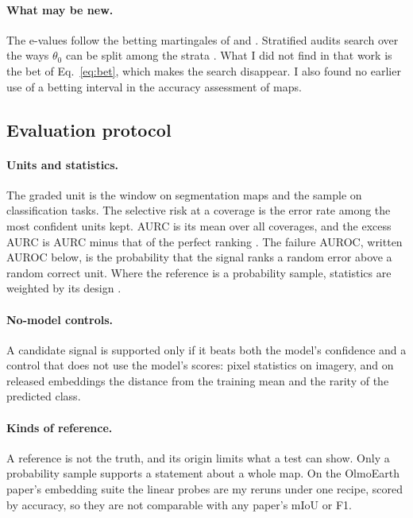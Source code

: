 \documentclass[11pt,a4paper]{article}
\begin{document}
\paragraph{What may be new.} The e-values follow the betting martingales of \citet{waudbysmith2020,waudbysmith2024}
and \citet{stark2023alpha}. Stratified audits search over the ways $\theta_0$ can be split among the strata
\citep{ottoboni2018,spertus2022,spertus2024}. What I did not find in that work is the bet of Eq.~\eqref{eq:bet},
which makes the search disappear. I also found no earlier use of a betting interval in the accuracy assessment of
maps.

\subsection{Evaluation protocol}
\label{sec:protocol}

\paragraph{Units and statistics.} The graded unit is the window on segmentation maps and the sample on classification
tasks. The selective risk at a coverage is the error rate among the most confident units kept. AURC is its mean over
all coverages, and the excess AURC is AURC minus that of the perfect ranking \citep{geifman2019}. The failure AUROC,
written AUROC below, is the probability that the signal ranks a random error above a random correct unit. Where the
reference is a probability sample, statistics are weighted by its design \citep{olofsson2014}.

\paragraph{No-model controls.} A candidate signal is supported only if it beats both the model's confidence and a
control that does not use the model's scores: pixel statistics on imagery, and on released embeddings the distance
from the training mean and the rarity of the predicted class.

\paragraph{Kinds of reference.} A reference is not the truth, and its origin limits what a test can show. Only a
probability sample supports a statement about a whole map. On the OlmoEarth paper's embedding suite
\citep{herzog2025} the linear probes are my reruns under one recipe, scored by accuracy, so they are not comparable
with any paper's mIoU or F1.
\end{document}
